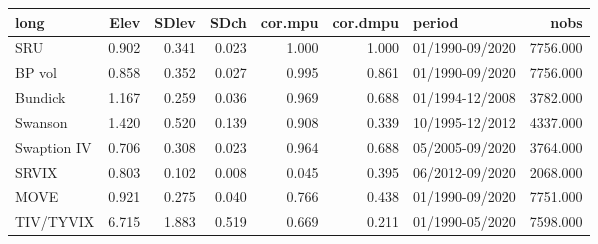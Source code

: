 \begin{tabular}{lrrrrrlr}
\toprule
long & Elev & SDlev & SDch & cor.mpu & cor.dmpu & period & nobs \\
\midrule
SRU & 0.902 & 0.341 & 0.023 & 1.000 & 1.000 & 01/1990-09/2020 & 7756.000 \\
BP vol & 0.858 & 0.352 & 0.027 & 0.995 & 0.861 & 01/1990-09/2020 & 7756.000 \\
Bundick & 1.167 & 0.259 & 0.036 & 0.969 & 0.688 & 01/1994-12/2008 & 3782.000 \\
Swanson & 1.420 & 0.520 & 0.139 & 0.908 & 0.339 & 10/1995-12/2012 & 4337.000 \\
Swaption IV & 0.706 & 0.308 & 0.023 & 0.964 & 0.688 & 05/2005-09/2020 & 3764.000 \\
SRVIX & 0.803 & 0.102 & 0.008 & 0.045 & 0.395 & 06/2012-09/2020 & 2068.000 \\
MOVE & 0.921 & 0.275 & 0.040 & 0.766 & 0.438 & 01/1990-09/2020 & 7751.000 \\
TIV/TYVIX & 6.715 & 1.883 & 0.519 & 0.669 & 0.211 & 01/1990-05/2020 & 7598.000 \\
\bottomrule
\end{tabular}
